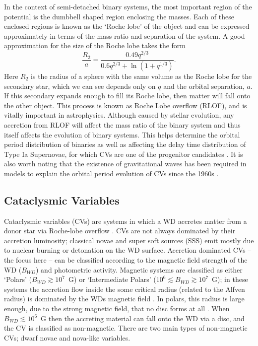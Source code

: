 In the context of semi-detached binary systems, the most important region of the 
potential is the dumbbell shaped region enclosing the masses. Each of these
enclosed regions is known as the `Roche lobe' of the object and can be expressed 
approximately in terms of the mass ratio and separation of the system. A good approximation
for the size of the Roche lobe takes the form \citep{eggleton1983}
\begin{equation}
\frac{R_2}{a} = \frac{0.49 q^{2/3}}{0.6q^{2/3} + \ln(1+q^{1/3})}.
\label{eq:roche2}
\end{equation} 
Here $R_2$ is the radius of a sphere with the same volume as the Roche lobe for the
secondary star, which we can see depends only on $q$ and the orbital separation, 
$a$. If this secondary expands enough to fill its Roche lobe, then matter
will fall onto the other object. This process is known as Roche Lobe overflow (RLOF),
and is vitally important in astrophysics. Although caused by stellar evolution,
any accretion from RLOF will affect the mass ratio of the binary system 
and thus itself affects the evolution
of binary systems. This helps determine the orbital period
distribution of binaries \citep[e.g.][]{knigge2011_evo} 
as well as affecting the delay time distribution
of Type Ia Supernovae, for which CVs are one of the progenitor candidates 
\citep[e.g.][]{wang2012}.
It is also worth noting that the existence of gravitational waves has been 
required in models to explain the orbital period evolution of CVs since
the 1960s \citep{kraft1962}. 


\subsection{Cataclysmic Variables}

Cataclysmic variables (CVs) are systems in which a WD
accretes matter from a donor star via Roche-lobe overflow 
\citep[see the `CV bible', ][]{warnerbook}. 
CVs are not always dominated by their accretion luminosity; 
classical novae and super soft sources 
(SSS) emit mostly due to nuclear burning or detonation on the WD surface.
Accretion dominated CVs -- the focus here -- can be classified according to the 
magnetic field strength of the WD ($B_{WD} $) and photometric activity. 
Magnetic systems are classified as either `Polars' ($B_{WD} \gtrsim 10^7$~G)
or `Intermediate Polars' ($10^6 \lesssim B_{WD}  \gtrsim 10^7$~G);
in these systems the accretion flow inside the some critical radius 
(related to the Alfven radius)
is dominated by the WDs magnetic field \citep[e.g.][]{patterson1994}. 
In polars, this radius is large enough, due to the strong magnetic field,
that no disc forms at all \citep{liebert1985}.
When $B_{WD}  \lesssim 10^6$~G then the accreting material can fall
onto the WD via a disc, and the CV is classified as non-magnetic.
There are two main types of non-magnetic CVs; dwarf novae and nova-like
variables.

